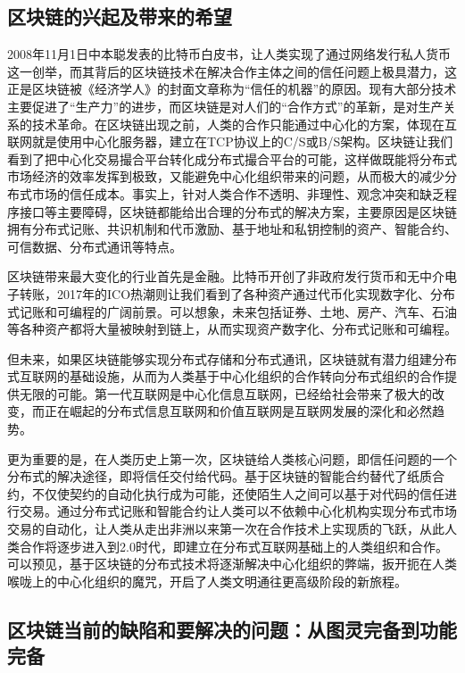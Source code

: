 \documentclass[a4paper,12pt]{article}
\begin{document}
\subsection{区块链的兴起及带来的希望}                    

2008年11月1日中本聪发表的比特币白皮书，让人类实现了通过网络发行私人货币这一创举，而其背后的区块链技术在解决合作主体之间的信任问题上极具潜力，这正是区块链被《经济学人》的封面文章称为“信任的机器”的原因。现有大部分技术主要促进了“生产力”的进步，而区块链是对人们的“合作方式”的革新，是对生产关系的技术革命。在区块链出现之前，人类的合作只能通过中心化的方案，体现在互联网就是使用中心化服务器，建立在TCP协议上的C/S或B/S架构。区块链让我们看到了把中心化交易撮合平台转化成分布式撮合平台的可能，这样做既能将分布式市场经济的效率发挥到极致，又能避免中心化组织带来的问题，从而极大的减少分布式市场的信任成本。事实上，针对人类合作不透明、非理性、观念冲突和缺乏程序接口等主要障碍，区块链都能给出合理的分布式的解决方案，主要原因是区块链拥有分布式记账、共识机制和代币激励、基于地址和私钥控制的资产、智能合约、可信数据、分布式通讯等特点。

区块链带来最大变化的行业首先是金融。比特币开创了非政府发行货币和无中介电子转账，2017年的ICO热潮则让我们看到了各种资产通过代币化实现数字化、分布式记账和可编程的广阔前景。可以想象，未来包括证券、土地、房产、汽车、石油等各种资产都将大量被映射到链上，从而实现资产数字化、分布式记账和可编程。

但未来，如果区块链能够实现分布式存储和分布式通讯，区块链就有潜力组建分布式互联网的基础设施，从而为人类基于中心化组织的合作转向分布式组织的合作提供无限的可能。第一代互联网是中心化信息互联网，已经给社会带来了极大的改变，而正在崛起的分布式信息互联网和价值互联网是互联网发展的深化和必然趋势。

更为重要的是，在人类历史上第一次，区块链给人类核心问题，即信任问题的一个分布式的解决途径，即将信任交付给代码。基于区块链的智能合约替代了纸质合约，不仅使契约的自动化执行成为可能，还使陌生人之间可以基于对代码的信任进行交易。通过分布式记账和智能合约让人类可以不依赖中心化机构实现分布式市场交易的自动化，让人类从走出非洲以来第一次在合作技术上实现质的飞跃，从此人类合作将逐步进入到2.0时代，即建立在分布式互联网基础上的人类组织和合作。可以预见，基于区块链的分布式技术将逐渐解决中心化组织的弊端，扳开扼在人类喉咙上的中心化组织的魔咒，开启了人类文明通往更高级阶段的新旅程。

\subsection{区块链当前的缺陷和要解决的问题：从图灵完备到功能完备}
\end{document}
